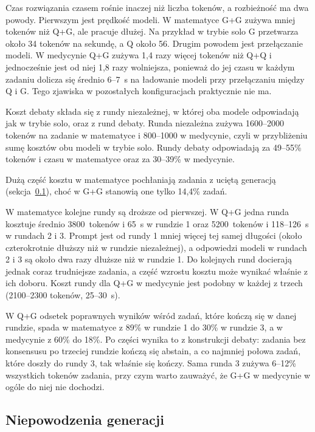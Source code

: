 Czas rozwiązania czasem rośnie inaczej niż liczba tokenów, a rozbieżność ma dwa powody. Pierwszym jest prędkość modeli. W matematyce G+G zużywa mniej tokenów niż Q+G, ale pracuje dłużej. Na przykład w trybie solo G przetwarza około 34 tokenów na sekundę, a Q około 56. Drugim powodem jest przełączanie modeli. W medycynie Q+G zużywa 1,4 razy więcej tokenów niż Q+Q i jednocześnie jest od niej 1,8 razy wolniejsza, ponieważ do jej czasu w każdym zadaniu dolicza się średnio 6--7~s na ładowanie modeli przy przełączaniu między Q i G. Tego zjawiska w pozostałych konfiguracjach praktycznie nie ma.

Koszt debaty składa się z rundy niezależnej, w której oba modele odpowiadają jak w trybie solo, oraz z rund debaty. Runda niezależna zużywa 1600--2000 tokenów na zadanie w matematyce i 800--1000 w medycynie, czyli w przybliżeniu sumę kosztów obu modeli w trybie solo. Rundy debaty odpowiadają za 49--55\% tokenów i czasu w matematyce oraz za 30--39\% w medycynie.

Dużą część kosztu w matematyce pochłaniają zadania z uciętą generacją (sekcja~\ref{sec:niepowodzenia}), choć w G+G stanowią one tylko 14,4\% zadań.

W matematyce kolejne rundy są droższe od pierwszej. W Q+G jedna runda kosztuje średnio 3800~tokenów i 65~s w rundzie 1 oraz 5200~tokenów i 118--126~s w rundach 2 i 3. Prompt jest od rundy 1 mniej więcej tej samej długości (około czterokrotnie dłuższy niż w rundzie niezależnej), a odpowiedzi modeli w rundach 2 i 3 są około dwa razy dłuższe niż w rundzie 1. Do kolejnych rund docierają jednak coraz trudniejsze zadania, a część wzrostu kosztu może wynikać właśnie z ich doboru. Koszt rundy dla Q+G w medycynie jest podobny w każdej z trzech (2100--2300 tokenów, 25--30~s).

W Q+G odsetek poprawnych wyników wśród zadań, które kończą się w danej rundzie, spada w matematyce z 89\% w rundzie 1 do 30\% w rundzie 3, a w medycynie z 60\% do 18\%. Po części wynika to z konstrukcji debaty: zadania bez konsensusu po trzeciej rundzie kończą się abstain, a co najmniej połowa zadań, które doszły do rundy 3, tak właśnie się kończy. Sama runda 3 zużywa 6--12\% wszystkich tokenów zadania, przy czym warto zauważyć, że G+G w medycynie w ogóle do niej nie dochodzi.

\subsection{Niepowodzenia generacji}
\label{sec:niepowodzenia}

